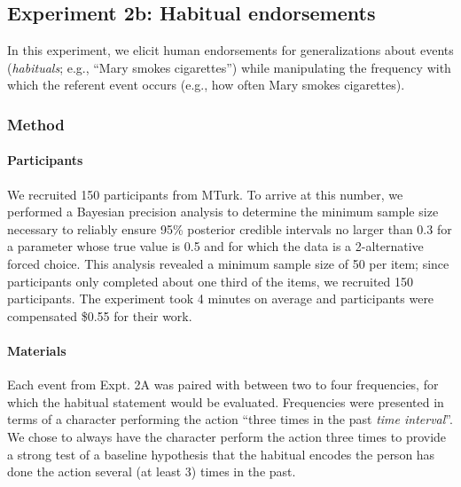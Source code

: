 \documentclass[english,,man,floatsintext]{apa6}
\let\oldparagraph\paragraph
\renewcommand{\paragraph}[1]{\oldparagraph{#1}\mbox{}}
\theoremstyle{definition}
\theoremstyle{definition}
\theoremstyle{definition}
\theoremstyle{remark}
\begin{document}
\hypertarget{experiment-2b-habitual-endorsements}{%
\subsection{Experiment 2b: Habitual
endorsements}\label{experiment-2b-habitual-endorsements}}

In this experiment, we elicit human endorsements for generalizations
about events (\emph{habituals}; e.g., \enquote{Mary smokes cigarettes})
while manipulating the frequency with which the referent event occurs
(e.g., how often Mary smokes cigarettes).

\hypertarget{method-3}{%
\subsubsection{Method}\label{method-3}}

\hypertarget{participants-3}{%
\paragraph{Participants}\label{participants-3}}

We recruited 150 participants from MTurk. To arrive at this number, we
performed a Bayesian precision analysis to determine the minimum sample
size necessary to reliably ensure 95\% posterior credible intervals no
larger than 0.3 for a parameter whose true value is 0.5 and for which
the data is a 2-alternative forced choice. This analysis revealed a
minimum sample size of 50 per item; since participants only completed
about one third of the items, we recruited 150 participants. The
experiment took 4 minutes on average and participants were compensated
\$0.55 for their work.

\hypertarget{materials-1}{%
\paragraph{Materials}\label{materials-1}}

Each event from Expt. 2A was paired with between two to four
frequencies, for which the habitual statement would be evaluated.
Frequencies were presented in terms of a character performing the action
\enquote{three times in the past \emph{time interval}}. We chose to
always have the character perform the action three times to provide a
strong test of a baseline hypothesis that the habitual encodes the
person has done the action several (at least 3) times in the past.
\end{document}
